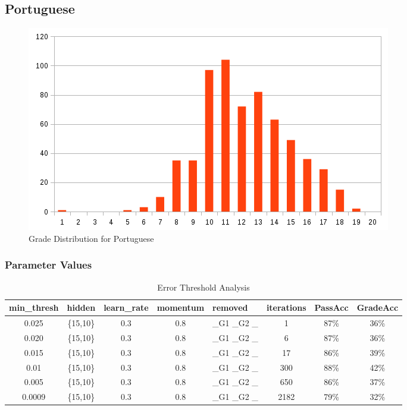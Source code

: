 \documentclass[11pt]{article}
\begin{document}
\subsection{Portuguese}
\begin{figure}[H]
\label{fig:Grade Distribution for Portuguese}
\includegraphics[scale=0.6]{por-chart.png}
\centering
\caption{Grade Distribution for Portuguese}
\end{figure}
\subsubsection{Parameter Values}
\begin{table}[h]

\begin{tabular}{| c | c | c | c | p{3cm} | c | c | c |}
\hline \textbf{min\_thresh} & \textbf{hidden} & \textbf{learn\_rate} & \textbf{momentum} & \textbf{removed} & \textbf{iterations} & \textbf{PassAcc} & \textbf{GradeAcc}\\
\hline 0.025 & \{15,10\} & 0.3 & 0.8 & \_G1 \_G2 \_ & 1 & 87\% & 36\%\\
\hline 0.020 & \{15,10\} & 0.3 & 0.8 & \_G1 \_G2 \_ & 6 & 87\% & 36\%\\
\hline 0.015 & \{15,10\} & 0.3 & 0.8 & \_G1 \_G2 \_ & 17 & 86\% & 39\%\\
\hline 0.01 & \{15,10\} & 0.3 & 0.8 & \_G1 \_G2 \_ & 300 & 88\% & 42\%\\
\hline 0.005 & \{15,10\} & 0.3 & 0.8 & \_G1 \_G2 \_ & 650 & 86\% & 37\%\\
\hline 0.0009 & \{15,10\} & 0.3 & 0.8 & \_G1 \_G2 \_ & 2182 & 79\% & 32\%\\
\hline
\end{tabular}
\caption{Error Threshold Analysis}
\end{table}
\end{document}
